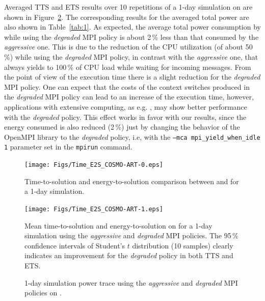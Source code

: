 Averaged TTS and ETS results over 10 repetitions of a 1-day simulation
on \tinto  are shown in Figure~\ref{fig:4}.  The corresponding results
for the averaged total power  are also shown in Table~\ref{tab:1}.  As
expected, the average total power consumption by \cosmoart while using
the \emph{degraded} MPI policy is  about 2\,\% less than that consumed
by the \emph{aggressive} one. This is  due to the reduction of the CPU
utilization  (of about  50\,\%)  while using  the \emph{degraded}  MPI
policy, in contrast with the \emph{aggressive} one, that always yields
to 100\,\% of  CPU load while waiting for  incoming messages. From the
point of  view of the execution  time there is a  slight reduction for
the \emph{degraded} MPI  policy. One can expect that  the costs of the
context switches  produced in the \emph{degraded} MPI  policy can lead
to  an increase  of  the execution  time,  however, applications  with
extensive computing,  as e.g.  \cosmoart, may  show better performance
with the \emph{degraded}  policy. This effect works in  favor with our
results, since  the energy  consumed is also  reduced (2\,\%)  just by
changing the  behavior of the  OpenMPI library to  the \emph{degraded}
policy,   i.e,  with   the  \texttt{--mca   mpi\_yield\_when\_idle  1}
parameter set in the \texttt{mpirun} command.

\begin{figure}[ht]
  \centering
  \texttt{[image: Figs/Time\_E2S\_COSMO-ART-0.eps]}
  \caption{Time-to-solution and  energy-to-solution comparison between
    \pilat and \monch for a 1-day simulation.}
  \label{fig:3}
\end{figure}

\begin{figure}[ht]
  \centering
  \texttt{[image: Figs/Time\_E2S\_COSMO-ART-1.eps]}
  \vspace{-1cm}
  \caption{Mean time-to-solution and  energy-to-solution on \tinto for
    a 1-day simulation using the \emph{aggressive} and \emph{degraded}
    MPI  policies. The  95\,\% confidence  intervals of  Student's $t$
    distribution (10 samples) clearly indicates an improvement for the
    \emph{degraded} policy in both TTS and ETS.}
  \label{fig:4}
\end{figure}

\begin{figure}[ht]
  \centering
  \hspace{0.8cm} \scalebox{0.62}{}
  \caption{1-day  simulation power  trace using  the \emph{aggressive}
    and \emph{degraded} MPI policies on \tinto.}
  \label{fig:5}
\end{figure}

